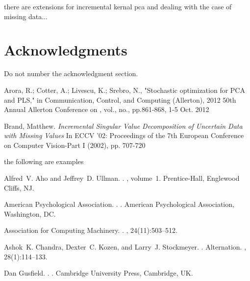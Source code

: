 \documentclass[11pt,letterpaper]{article}
\begin{document}
there are extensions for incremental kernal pca and dealing with the case of missing data...

\section*{Acknowledgments}

Do not number the acknowledgment section.

\begin{thebibliography}{}


  
   Arora, R.; Cotter, A.; Livescu, K.; Srebro, N., "Stochastic optimization for PCA and PLS," in Communication, Control, and Computing (Allerton), 2012 50th Annual Allerton Conference on , vol., no., pp.861-868, 1-5 Oct. 2012
  
    Brand, Matthew. {\em Incremental Singular Value Decomposition of Uncertain Data with Missing Values} In ECCV '02: Proceedings of the 7th European Conference on Computer Vision-Part I (2002), pp. 707-720
  
  

the following are examples

Alfred~V. Aho and Jeffrey~D. Ullman.
.
, volume~1.
\newblock Prentice-{Hall}, Englewood Cliffs, NJ.

{American Psychological Association}.
.
.
\newblock American Psychological Association, Washington, DC.

{Association for Computing Machinery}.
.
, 24(11):503--512.

Ashok~K. Chandra, Dexter~C. Kozen, and Larry~J. Stockmeyer.
.
\newblock Alternation.
,
  28(1):114--133.

Dan Gusfield.
.
.
\newblock Cambridge University Press, Cambridge, UK.

\end{thebibliography}
\end{document}
